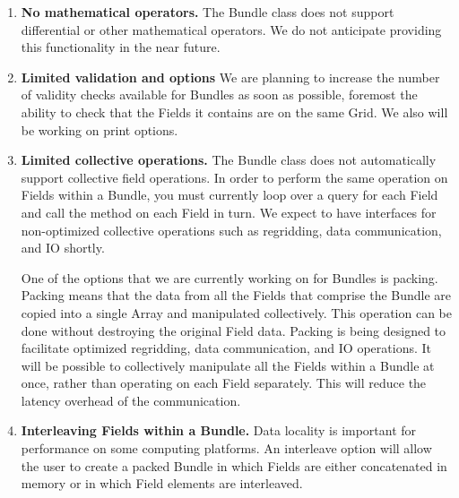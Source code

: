 
\label{sec:bundlerest}

\begin{enumerate}
\item{\bf No mathematical operators.}
The Bundle class does not support differential or other
mathematical operators.  We do not anticipate providing this 
functionality in the near future.

\item{\bf Limited validation and options}
We are planning to increase the number of validity checks available
for Bundles as soon as possible, foremost the ability to check 
that the Fields it contains are on the same Grid.  We also will
be working on print options.

\item{\bf Limited collective operations.}
The Bundle class does not automatically support collective field 
operations.  In order to perform the same operation on Fields within
a Bundle, you must currently loop over a query for each Field and
call the method on each Field in turn.  We expect to have 
interfaces for non-optimized collective operations such as 
regridding, data communication, and IO shortly.

One of the options that we are currently working on for Bundles is
packing.  Packing means that the data from all the
Fields that comprise the Bundle are copied into a single Array and
manipulated collectively.  This operation can be done without 
destroying the original Field data.  Packing is being designed to 
facilitate optimized regridding, data communication, and IO operations.  
It will be possible to collectively manipulate all the Fields within 
a Bundle at once, rather than operating on each Field separately.  
This will reduce the latency overhead of the communication.  

\item{\bf Interleaving Fields within a Bundle.}
Data locality is important for performance on some computing
platforms.  An interleave option will allow the user to create
a packed Bundle in which Fields are either concatenated in memory
or in which Field elements are interleaved.

\end{enumerate}




